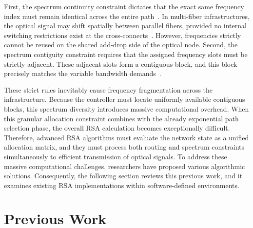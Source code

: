 \documentclass[12pt, a4paper, twoside, openright]{report}
\begin{document}
First, the spectrum continuity constraint dictates that the exact same frequency index must remain identical across the entire path~\cite{algorithmResearchRSAONR}. In multi-fiber infrastructures, the optical signal may shift spatially between parallel fibers, provided no internal switching restrictions exist at the cross-connects~\cite{efficientDynamicRSAEon}. However, frequencies strictly cannot be reused on the shared add-drop side of the optical node. Second, the spectrum contiguity constraint requires that the assigned frequency slots must be strictly adjacent. These adjacent slots form a contiguous block, and this block precisely matches the variable bandwidth demands~\cite{algorithmsRSATaxonomy}.

These strict rules inevitably cause frequency fragmentation across the infrastructure. Because the controller must locate uniformly available contiguous blocks, this spectrum diversity introduces massive computational overhead. When this granular allocation constraint combines with the already exponential path selection phase, the overall RSA calculation becomes exceptionally difficult. Therefore, advanced RSA algorithms must evaluate the network state as a unified allocation matrix, and they must process both routing and spectrum constraints simultaneously to efficient transmission of optical signals. To address these massive computational challenges, researchers have proposed various algorithmic solutions. Consequently, the following section reviews this previous work, and it examines existing RSA implementations within software-defined environments.
\section{Previous Work}
\end{document}
